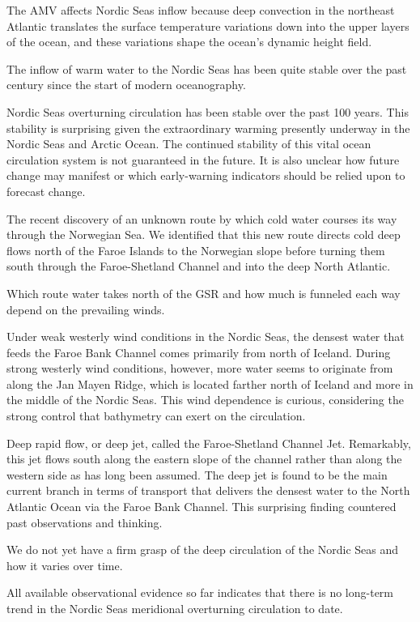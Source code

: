 \documentclass[
]{book}
\begin{document}
The AMV affects Nordic Seas inflow because deep convection in the northeast Atlantic translates the surface temperature variations down into the upper layers of the ocean, and these variations shape the ocean's dynamic height field.

The inflow of warm water to the Nordic Seas has been quite stable over the past century since the start of modern oceanography.

Nordic Seas overturning circulation has been stable over the past 100 years. This stability is surprising given the extraordinary warming presently underway in the Nordic Seas and Arctic Ocean.
The continued stability of this vital ocean circulation system is not guaranteed in the future. It is also unclear how future change may manifest or which early-warning indicators should be relied upon to forecast change.

The recent discovery of an unknown route by which cold water courses its way through the Norwegian Sea. We identified that this new route directs cold deep flows north of the Faroe Islands to the Norwegian slope before turning them south through the Faroe-Shetland Channel and into the deep North Atlantic.

Which route water takes north of the GSR and how much is funneled each way depend on the prevailing winds.

Under weak westerly wind conditions in the Nordic Seas, the densest water that feeds the Faroe Bank Channel comes primarily from north of Iceland. During strong westerly wind conditions, however, more water seems to originate from along the Jan Mayen Ridge, which is located farther north of Iceland and more in the middle of the Nordic Seas. This wind dependence is curious, considering the strong control that bathymetry can exert on the circulation.

Deep rapid flow, or deep jet, called the Faroe-Shetland Channel Jet. Remarkably, this jet flows south along the eastern slope of the channel rather than along the western side as has long been assumed. The deep jet is found to be the main current branch in terms of transport that delivers the densest water to the North Atlantic Ocean via the Faroe Bank Channel. This surprising finding countered past observations and thinking.

We do not yet have a firm grasp of the deep circulation of the Nordic Seas and how it varies over time.

All available observational evidence so far indicates that there is no long-term trend in the Nordic Seas meridional overturning circulation to date.
\end{document}
